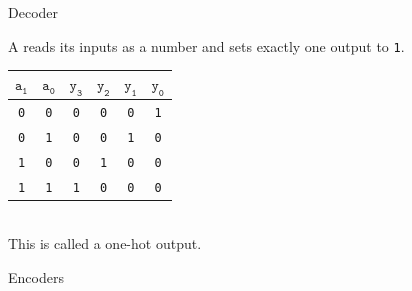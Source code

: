 \documentclass[mathserif, handout]{beamer}
\newcommand{\ttab}[1]{\texttt{#1}}
\begin{document}
\begin{frame}{Decoder}
  \begin{center}
    \Large {}
  \end{center}
\end{frame}

\begin{frame}
  A  reads its inputs as a number and sets exactly one output to \ttab{1}.\\[3mm]
  \begin{minipage}{0.45\textwidth}
    \centering
  \end{minipage}%
  \begin{minipage}{0.55\textwidth}
    \centering
    \renewcommand{\arraystretch}{1.2}
    \begin{tabular}{cc|cccc}
      $\ttab{a}_{\ttab{1}}$ & $\ttab{a}_{\ttab{0}}$ & $\ttab{y}_{\ttab{3}}$ & $\ttab{y}_{\ttab{2}}$ & $\ttab{y}_{\ttab{1}}$ & $\ttab{y}_{\ttab{0}}$ \\ \hline
      \ttab{0} & \ttab{0} & \ttab{0} & \ttab{0} & \ttab{0} & \ttab{1} \\
      \ttab{0} & \ttab{1} & \ttab{0} & \ttab{0} & \ttab{1} & \ttab{0} \\
      \ttab{1} & \ttab{0} & \ttab{0} & \ttab{1} & \ttab{0} & \ttab{0} \\
      \ttab{1} & \ttab{1} & \ttab{1} & \ttab{0} & \ttab{0} & \ttab{0} \\
    \end{tabular}
  \end{minipage}
\\[3mm]
This is called a one-hot output.
\end{frame}


\begin{frame}{Encoders}
  \begin{center}
    \Large {}
  \end{center}
\end{frame}
\end{document}
